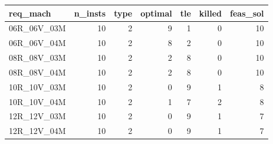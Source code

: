 
\begin{tabular}{lrrrrrr}
\toprule
req\_mach & n\_insts & type & optimal & tle & killed & feas\_sol\\
\midrule
06R\_06V\_03M & 10 & 2 & 9 & 1 & 0 & 10\\
06R\_06V\_04M & 10 & 2 & 8 & 2 & 0 & 10\\
08R\_08V\_03M & 10 & 2 & 2 & 8 & 0 & 10\\
08R\_08V\_04M & 10 & 2 & 2 & 8 & 0 & 10\\
10R\_10V\_03M & 10 & 2 & 0 & 9 & 1 & 8\\
\addlinespace
10R\_10V\_04M & 10 & 2 & 1 & 7 & 2 & 8\\
12R\_12V\_03M & 10 & 2 & 0 & 9 & 1 & 7\\
12R\_12V\_04M & 10 & 2 & 0 & 9 & 1 & 7\\
\bottomrule
\end{tabular}

